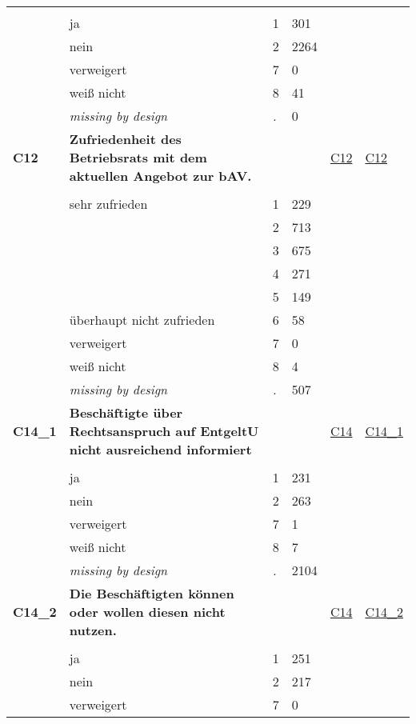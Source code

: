 \begin{longtable}{| L{2.45cm} | L{6cm} | C{1.5cm} | R{1cm} | C{2.25cm} | C{2.25cm} |}
   &  &  &  &  &  \\ 
   & ja & 1 & 301 &  &  \\ 
   & nein & 2 & 2264 &  &  \\ 
   & verweigert & 7 & 0 &  &  \\ 
   & weiß nicht & 8 & 41 &  &  \\ 
   & \textit{missing by design} & \textit{.} & 0 &  &  \\ 
   \midrule
\textbf{C12}\label{var:C12} & \textbf{Zufriedenheit des Betriebsrats mit dem aktuellen Angebot zur bAV.} &  &  & \hyperref[C12]{C12} & \hyperref[var:suf:C12]{C12} \\ 
   &  &  &  &  &  \\ 
   & sehr zufrieden & 1 & 229 &  &  \\ 
   &  & 2 & 713 &  &  \\ 
   &  & 3 & 675 &  &  \\ 
   &  & 4 & 271 &  &  \\ 
   &  & 5 & 149 &  &  \\ 
   & überhaupt nicht zufrieden & 6 & 58 &  &  \\ 
   & verweigert & 7 & 0 &  &  \\ 
   & weiß nicht & 8 & 4 &  &  \\ 
   & \textit{missing by design} & \textit{.} & 507 &  &  \\ 
   \midrule
\textbf{C14\_1}\label{var:C14:1} & \textbf{Beschäftigte über Rechtsanspruch auf EntgeltU nicht ausreichend informiert} &  &  & \hyperref[C14]{C14} & \hyperref[var:suf:C14:1]{C14\_1} \\ 
   &  &  &  &  &  \\ 
   & ja & 1 & 231 &  &  \\ 
   & nein & 2 & 263 &  &  \\ 
   & verweigert & 7 & 1 &  &  \\ 
   & weiß nicht & 8 & 7 &  &  \\ 
   & \textit{missing by design} & \textit{.} & 2104 &  &  \\ 
   \midrule
\textbf{C14\_2}\label{var:C14:2} & \textbf{Die Beschäftigten können oder wollen diesen nicht nutzen.} &  &  & \hyperref[C14]{C14} & \hyperref[var:suf:C14:2]{C14\_2} \\ 
   &  &  &  &  &  \\ 
   & ja & 1 & 251 &  &  \\ 
   & nein & 2 & 217 &  &  \\ 
   & verweigert & 7 & 0 &  &  \\ 

\end{longtable}
